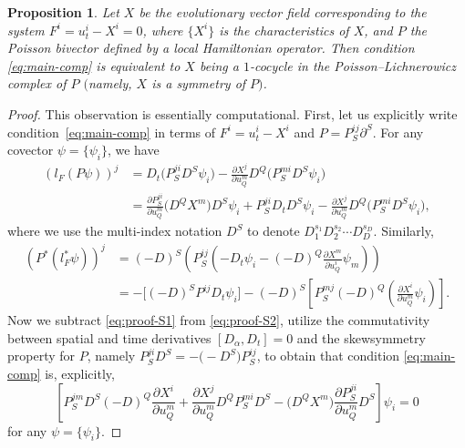 \documentclass[pdftex]{sigma}
\numberwithin{equation}{section}
\newtheorem{Proposition}[Theorem]{Proposition}
 { \theoremstyle{definition}
\newtheorem{Definition}[Theorem]{Definition}
\newtheorem{Note}[Theorem]{Note}
\newtheorem{Example}[Theorem]{Example}
\newtheorem{Remark}[Theorem]{Remark} }
\begin{document}
\begin{Proposition}
Let $X$ be the evolutionary vector field corresponding to the system $F^i=u^i_t-X^i=0$, where $\{X^i\}$ is the characteristics of $X$, and $P$ the Poisson bivector defined by a local Hamiltonian operator. Then condition \eqref{eq:main-comp} is equivalent to $X$ being a $1$-cocycle in the Poisson--Lichnerowicz complex of $P$ $($namely, $X$ is a symmetry of $P)$.
\end{Proposition}
\begin{proof}
This observation is essentially computational. First, let us explicitly write condition~\eqref{eq:main-comp} in terms of $F^i=u^i_t-X^i$ and $P=P^{ij}_S\partial^S$. For any covector $\psi=\{\psi_i\}$, we have
\begin{align}
(l_F(P\psi))^j&=D_t\big(P^{ji}_SD^S\psi_i\big)-\frac{\partial X^j}{\partial u^m_Q}D^Q\big(P^{mi}_SD^S\psi_i\big)\nonumber\\
&=\frac{\partial P^{ji}_S}{\partial u^m_Q}\big(D^Q X^m\big)D^S\psi_i+P^{ji}_SD_tD^S\psi_i-\frac{\partial X^j}{\partial u^m_Q}D^Q\big(P^{mi}_SD^S\psi_i\big),\label{eq:proof-S1}
\end{align}
where we use the multi-index notation $D^S$ to denote $D_1^{s_1}D_2^{s_2}\cdots D^{s_D}_{D}$.
Similarly,
\begin{align}
(P^*(l_F^*\psi))^j&=(-D)^S\left(P^{ij}_S\left(-D_t\psi_i-(-D)^Q\frac{\partial X^m}{\partial u^i_Q}\psi_m\right)\right)\nonumber\\
&=-\big[(-D)^SP^{ij}D_t\psi_i\big]-(-D)^S\left[ P^{mj}_S(-D)^Q\left(\frac{\partial X^i}{\partial u^m_Q}\psi_i\right)\right].\label{eq:proof-S2}
\end{align}
Now we subtract \eqref{eq:proof-S1} from \eqref{eq:proof-S2}, utilize the commutativity between spatial and time derivatives $[D_\alpha,D_t]=0$ and the skewsymmetry property for $P$, namely $P^{ji}_SD^S=-\bigl(-D^S\bigr)P^{ij}_S$, to obtain that condition \eqref{eq:main-comp} is, explicitly,
\begin{equation}\label{eq:proof-comp}
\left[P^{jm}_SD^S(-D)^Q\frac{\partial X^i}{\partial u^m_Q}+\frac{\partial X^j}{\partial u^m_Q}D^QP^{mi}_SD^S-\big(D^QX^m\big)\frac{\partial P^{ji}_S}{\partial u^m_Q}D^S\right]\psi_i=0
\end{equation}
for any $\psi=\{\psi_i\}$.


\end{proof}
\end{document}
